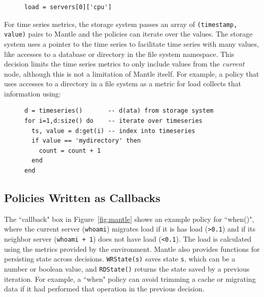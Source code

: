 \begin{figure}[h]
\begin{verbatim}
load = servers[0]['cpu']
\end{verbatim}
\end{figure}

For time series metrics, the storage system passes an array of \texttt{(timestamp,
value)} pairs to Mantle and the policies can iterate over the values. The
storage system uses a pointer to the time series to facilitate time series with many
values, like accesses to a database or directory in the file system namespace.
This decision limits the time series metrics to only include values from the
{\it current} node, although this is not a limitation of Mantle itself.  For
example, a policy that uses accesses to a directory in a file system as a
metric for load collects that information using:\\

\begin{figure}[h]
\ssp
\begin{verbatim}
d = timeseries()       -- d(ata) from storage system
for i=1,d:size() do    -- iterate over timeseries
  ts, value = d:get(i) -- index into timeseries 
  if value == 'mydirectory' then
    count = count + 1
  end
end
\end{verbatim}
\dsp
\end{figure}



\subsection{Policies Written as Callbacks} The ``callback" box in
Figure~\ref{fig:mantle} shows an example policy for ``when()", where the
current server (\texttt{whoami}) migrates load if it is has load
(\texttt{>0.1}) and if its neighbor server (\texttt{whoami + 1}) does not have
load (\texttt{<0.1}). The load is calculated using the metrics provided by the
environment. Mantle also provides functions for persisting state across decisions.
\texttt{WRState(s)} saves state \texttt{s}, which can be a number or boolean
value, and \texttt{RDState()} returns the state saved by a previous iteration.
For example, a ``when" policy can avoid trimming a cache or migrating data if
it had performed that operation in the previous decision.



